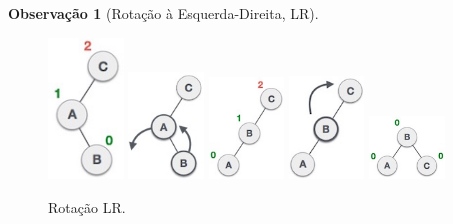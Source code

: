 \documentclass[a4paper, 12pt]{article}
\newtheorem{remark}{Observação}
\begin{document}
\begin{remark}[Rotação à Esquerda-Direita, LR]\end{remark}
\begin{figure}[H]
    \centering
    \includegraphics[width=2cm]{fig/t/right_subtree_of_left_subtree.jpg}
    \includegraphics[width=2cm]{fig/t/subtree_left_rotation.jpg}
    \includegraphics[width=2cm]{fig/t/left_unbalanced_tree.jpg}
    \includegraphics[width=2cm]{fig/t/right_rotation.jpg}
    \includegraphics[width=2cm]{fig/t/balanced_avl_tree.jpg}
    \caption{Rotação LR.}
\end{figure}
\end{document}
